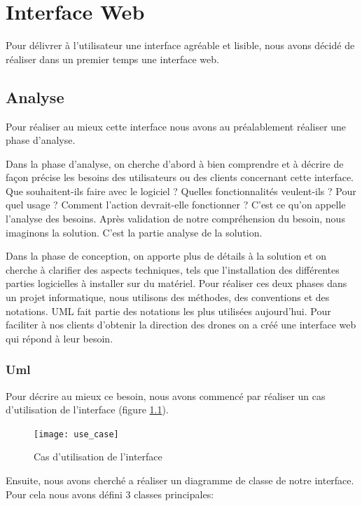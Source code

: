 
\chapter{Interface Web}
\label{Logiciel}

Pour délivrer à l'utilisateur une interface agréable et lisible, nous avons décidé de réaliser dans un premier temps une interface web.

\section{Analyse}
\label{sec:uml}

Pour réaliser au mieux cette interface nous avons au préalablement réaliser une phase d'analyse.

Dans la phase d’analyse, on cherche d’abord à bien comprendre et à décrire de façon précise les besoins des utilisateurs ou des clients concernant cette interface. Que souhaitent-ils faire avec le logiciel ? Quelles fonctionnalités veulent-ils ? Pour quel usage ? Comment l’action devrait-elle fonctionner ? C’est ce qu’on appelle \og l’analyse des besoins\fg{}. Après validation de notre compréhension du besoin, nous imaginons la solution. C’est la partie analyse de la solution.

Dans la phase de conception, on apporte plus de détails à la solution et on cherche à clarifier des aspects techniques, tels que l’installation des différentes parties logicielles à installer sur du matériel. Pour réaliser ces deux phases dans un projet informatique, nous utilisons des méthodes, des conventions et des notations. UML fait partie des notations les plus utilisées aujourd’hui. Pour faciliter à nos clients d’obtenir la direction des drones on a créé une interface web qui répond à leur besoin.

\subsection{Uml}

Pour décrire au mieux ce besoin, nous avons commencé par réaliser un cas d'utilisation de l'interface (figure \ref{fig:use_case}).
\begin{figure}[!h]
  \centering
  \texttt{[image: use\_case]}
  \caption{Cas d'utilisation de l'interface}
  \label{fig:use_case}
\end{figure}

\newpage
Ensuite, nous avons cherché a réaliser un diagramme de classe de notre interface. Pour cela nous avons défini 3 classes principales:

